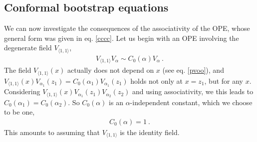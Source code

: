 \documentclass[12pt,a4paper,notitlepage]{report}
\numberwithin{equation}{section}
\theoremstyle{break}
\begin{document}
\subsection{Conformal bootstrap equations \label{seccbe}}

We can now investigate the consequences of the associativity of the OPE, whose general form was given in eq. \eqref{cccc}.
Let us begin with an OPE involving the degenerate field  $V_{\langle 1,1 \rangle}$,
\begin{align}
\boxed{V_{\langle 1,1 \rangle}V_\alpha \sim  C_0(\alpha) V_\alpha} \ .
\end{align}
The field $V_{\langle 1,1 \rangle}(x)$ actually does not depend on $x$ (see eq. \eqref{pvoo}), and $V_{\langle 1,1 \rangle}(x)V_{\alpha_1}(z_1) = C_0(\alpha_1) V_{\alpha_1}(z_1)$ holds not only at $x=z_1$, but for any $x$.
Considering  
$V_{\langle 1,1 \rangle}(x)V_{\alpha_1}(z_1)V_{\alpha_2}(z_2)$ and using associativity, we this leads to $C_0(\alpha_1)=C_0(\alpha_2)$.
So $C_0(\alpha)$ 
is an $\alpha$-independent constant, which we choose to be one,
\begin{align}
\boxed{ C_0(\alpha) = 1}\ .
\label{cza}
\end{align}
This amounts to assuming that $V_{\langle 1,1 \rangle}$ is the identity field. 
\end{document}

